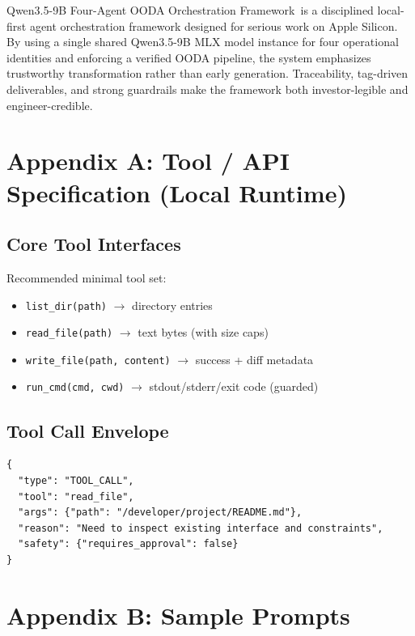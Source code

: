 \documentclass[11pt]{article}
\newcommand{\FrameworkName}{Qwen3.5-9B Four-Agent OODA Orchestration Framework}
\begin{document}
\FrameworkName\ is a disciplined local-first agent orchestration framework designed for serious work on Apple Silicon.
By using a single shared Qwen3.5-9B MLX model instance for four operational identities and enforcing a verified OODA pipeline, the system emphasizes trustworthy transformation rather than early generation.
Traceability, tag-driven deliverables, and strong guardrails make the framework both investor-legible and engineer-credible.

\appendix

\section{Appendix A: Tool / API Specification (Local Runtime)}

\subsection{Core Tool Interfaces}

Recommended minimal tool set:
\begin{itemize}
  \item \texttt{list\_dir(path)} \(\rightarrow\) directory entries
  \item \texttt{read\_file(path)} \(\rightarrow\) text bytes (with size caps)
  \item \texttt{write\_file(path, content)} \(\rightarrow\) success + diff metadata
  \item \texttt{run\_cmd(cmd, cwd)} \(\rightarrow\) stdout/stderr/exit code (guarded)
\end{itemize}

\subsection{Tool Call Envelope}

\begin{lstlisting}[style=json, caption={Tool call JSON envelope (recommended)}]
{
  "type": "TOOL_CALL",
  "tool": "read_file",
  "args": {"path": "/developer/project/README.md"},
  "reason": "Need to inspect existing interface and constraints",
  "safety": {"requires_approval": false}
}
\end{lstlisting}

\section{Appendix B: Sample Prompts}
\end{document}
